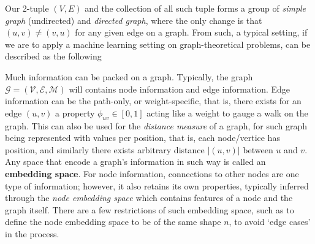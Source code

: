 Our 2-tuple $(V,E)$ and the collection of all such tuple forms a group of \textit{simple graph} (undirected) and \textit{directed graph}, where the only change is that $(u,v)\neq (v,u)$ for any given edge on a graph. From such, a typical setting, if we are to apply a machine learning setting on graph-theoretical problems, can be described as the following




Much information can be packed on a graph. Typically, the graph $\mathcal{G}= (\mathcal{V},\mathcal{E},\mathcal{M})$ will contains node information and edge information. Edge information can be the path-only, or weight-specific, that is, there exists for an edge $(u,v)$ a property $\phi_{uv}\in [0,1]$ acting like a weight to gauge a walk on the graph. This can also be used for the \textit{distance measure} of a graph, for such graph being represented with values per position, that is, each node/vertice has position, and similarly there exists arbitrary distance $\lvert (u,v)\rvert$ between $u$ and $v$. Any space that encode a graph's information in such way is called an \textbf{embedding space}. For node information, connections to other nodes are one type of information; however, it also retains its own properties, typically inferred through the \textit{node embedding space} which contains features of a node and the graph itself. There are a few restrictions of such embedding space, such as to define the node embedding space to be of the same shape $n$, to avoid `edge cases' in the process. 

